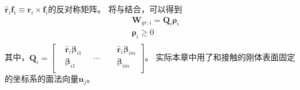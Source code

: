 ${{\hat{\boldsymbol{r}}}_{i}}{\boldsymbol{f}_{i}}\equiv {\boldsymbol{r}_{i}}\times {\boldsymbol{f}_{i}}$的反对称矩阵。
将与结合，可以得到
\begin{equation}
    \label{equ:wrench_matrix}
    \begin{aligned}
        & {{\boldsymbol{W}}_{gr,i}}={{\boldsymbol{Q}}_{i}}{{\boldsymbol{\rho}}_{i}} \\ 
       & {{\boldsymbol{\rho}}_{i}}\ge 0 \\ 
      \end{aligned}        
\end{equation}
其中，${{\boldsymbol{Q}}_{i}}=\left[ \begin{aligned}
    & {{{\hat{\boldsymbol{r}}}}_{i}}{{\boldsymbol{\beta}}_{i1}} \\ 
   & {{\boldsymbol{\beta}}_{i1}}\ \ \ \  \\ 
  \end{aligned} \right.\ \ \ \ \cdots \ \ \ \ \left. \begin{aligned}
    & {{{\hat{\boldsymbol{r}}}}_{i}}{{\boldsymbol{\beta}}_{im}} \\ 
   & {{\boldsymbol{\beta}}_{im}} \\ 
  \end{aligned} \right]
  $。
  实际本章中用了和接触的刚体表面固定的坐标系的面法向量${{\boldsymbol{n}}_{j}}$。
